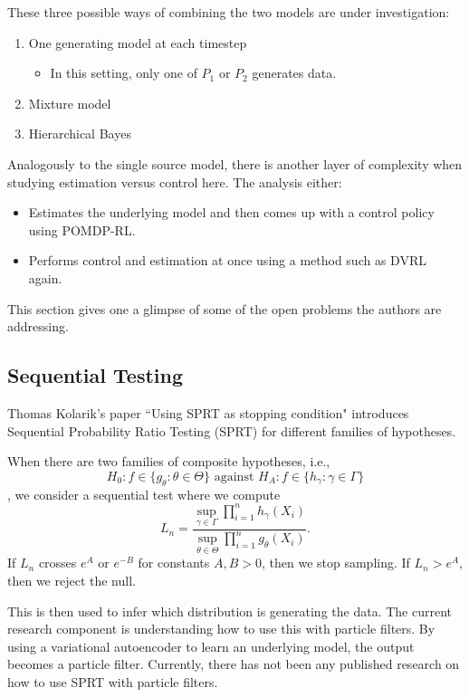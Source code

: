 \documentclass[english]{article}
\numberwithin{equation}{section}
\begin{document}
	These three possible ways of combining the two models are under investigation:
	\begin{enumerate}
		\item One generating model at each timestep
			\begin{itemize}
				\item In this setting, only one of $P_1$ or $P_2$ generates data.
			\end{itemize}
		\item Mixture model
		\item Hierarchical Bayes
	\end{enumerate}
	
	Analogously to the single source model, there is another layer of complexity when studying estimation versus control here. The analysis either:
	\begin{itemize}
		\item Estimates the underlying model and then comes up with a control policy using POMDP-RL.
		\item Performs control and estimation at once using a method such as DVRL again.
	\end{itemize}
	
	This section gives one a glimpse of some of the open problems the authors are addressing.
	
	\subsection*{Sequential Testing}
	Thomas Kolarik's paper ``Using SPRT as stopping condition" 
	\cite{url} introduces Sequential Probability Ratio Testing (SPRT) for different families of hypotheses.
	
	When there are two families of composite hypotheses, i.e.,
	$$H_0: f\in \{g_{\theta}:\theta\in \Theta\} \textrm{ against } H_A:f\in \{h_{\gamma}:\gamma\in \Gamma\}$$, we consider a sequential test where we compute $$L_n = \frac{\sup_{\gamma\in \Gamma} \prod_{i=1}^n h_{\gamma}(X_i)}{\sup_{\theta\in \Theta} \prod_{i=1}^n g_{\theta}(X_i)}.$$ If $L_n$ crosses $e^A$ or $e^{-B}$ for constants $A,B>0$, then we stop sampling. If $L_n>e^A$, then we reject the null.
	
	This is then used to infer which distribution is generating the data.  The current research component is understanding how to use this with particle filters. By using a variational autoencoder to learn an underlying model, the output becomes a particle filter. Currently, there has not been any published research on how to use SPRT with particle filters.
	
\end{document}
